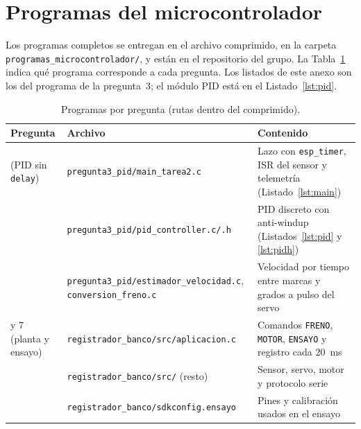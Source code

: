 \section{Programas del microcontrolador}
\label{sec:codigo}
Los programas completos se entregan en el archivo comprimido, en la carpeta
\texttt{programas\_microcontrolador/}, y están en el repositorio del grupo. La
Tabla~\ref{tab:programas} indica qué programa corresponde a cada pregunta. Los listados de este
anexo son los del programa de la pregunta~3; el módulo PID está en el Listado~\ref{lst:pid}.

\begin{table}[h]
\centering\small
\caption{Programas por pregunta (rutas dentro del comprimido).}
\label{tab:programas}
\begin{tabularx}{\linewidth}{@{}>{\raggedright\arraybackslash}p{2.6cm}>{\raggedright\arraybackslash}p{6.2cm}>{\raggedright\arraybackslash}X@{}}
\toprule
Pregunta & Archivo & Contenido \\
\midrule
3 (PID sin \texttt{delay}) & \texttt{pregunta3\_pid/main\_tarea2.c} & Lazo con \texttt{esp\_timer}, ISR del sensor y telemetría (Listado~\ref{lst:main}) \\
 & \texttt{pregunta3\_pid/pid\_controller.c/.h} & PID discreto con anti-windup (Listados~\ref{lst:pid} y \ref{lst:pidh}) \\
 & \texttt{pregunta3\_pid/estimador\_velocidad.c}, \texttt{conversion\_freno.c} & Velocidad por tiempo entre marcas y grados a pulso del servo \\
6 y 7 (planta y ensayo) & \texttt{registrador\_banco/src/aplicacion.c} & Comandos \texttt{FRENO}, \texttt{MOTOR}, \texttt{ENSAYO} y registro cada 20~ms \\
 & \texttt{registrador\_banco/src/} (resto) & Sensor, servo, motor y protocolo serie \\
 & \texttt{registrador\_banco/sdkconfig.ensayo} & Pines y calibración usados en el ensayo \\
\bottomrule
\end{tabularx}
\end{table}




